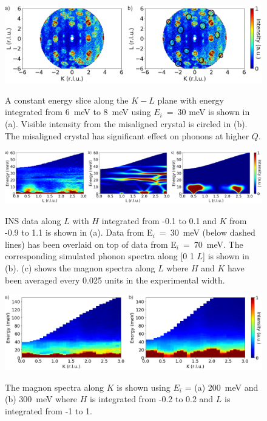 \documentclass[10pt,doublespacing,edeposit]{uiucthesis2020}
\begin{document}
\begin{mainmatter}
\begin{figure}[h]
\centering\includegraphics[width=0.8\columnwidth]{figures/ch8/suppl_misaligned_crystal_kl_slice.png} \\
\caption{\label{fig:misaligned_elastic}
A constant energy slice along the $K-L$ plane with energy integrated from 6~meV to 8~meV using $E_i$~=~30 meV is shown in (a). Visible intensity from the misaligned crystal is circled in (b). The misaligned crystal has significant effect on phonons at higher $Q$.
}
\end{figure}


\begin{figure}[h]
\centering\includegraphics[width=\columnwidth]{figures/ch8/suppl_01L_INS_data.png} \\
\caption{\label{fig:phonon_magnon_spectra_01L}
INS data along $L$ with $H$ integrated from -0.1 to 0.1 and $K$ from -0.9 to 1.1 is shown in (a). Data from E$_i$~=~30~meV (below dashed lines) has been overlaid on top of data from E$_i$~=~70~meV. The corresponding simulated phonon spectra along [0 1 $L$] is shown in (b). (c) shows the magnon spectra along $L$ where $H$ and $K$ have been averaged every 0.025 units in the experimental width.
}
\end{figure}


\begin{figure}[h]
\centering\includegraphics[width=\columnwidth]{figures/ch8/suppl_high_energy_data.png} \\
\caption{\label{fig:high_energy_data}
The magnon spectra along $K$ is shown using $E_i$ = (a) 200~meV and (b) 300~meV where $H$ is integrated from -0.2 to 0.2 and $L$ is integrated from -1 to 1.
}
\end{figure}





\end{mainmatter}
\end{document}
